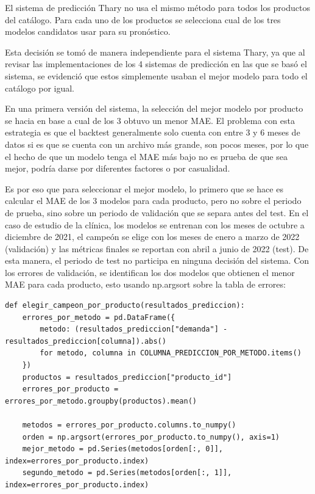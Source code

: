 El sistema de predicción Thary no usa el mismo método para todos los productos del catálogo. Para cada uno de los productos se selecciona cual de los tres modelos candidatos usar para su pronóstico. 

Esta decisión se tomó de manera independiente para el sistema Thary, ya que al revisar las implementaciones de los 4 sistemas de predicción en las que se basó el sistema, se evidenció que estos simplemente usaban el mejor modelo para todo el catálogo por igual.

En una primera versión del sistema, la selección del mejor modelo por producto se hacia en base a cual de los 3 obtuvo un menor MAE. El problema con esta estrategia es que el backtest generalmente solo cuenta con entre 3 y 6 meses de datos si es que se cuenta con un archivo más grande, son pocos meses, por lo que el hecho de que un modelo tenga el MAE más bajo no es prueba de que sea mejor, podría darse por diferentes factores o por casualidad. 

Es por eso que para seleccionar el mejor modelo, lo primero que se hace es calcular el MAE de los 3 modelos para cada producto, pero no sobre el periodo de prueba, sino sobre un periodo de validación que se separa antes del test. En el caso de estudio de la clínica, los modelos se entrenan con los meses de octubre a diciembre de 2021, el campeón se elige con los meses de enero a marzo de 2022 (validación) y las métricas finales se reportan con abril a junio de 2022 (test). De esta manera, el periodo de test no participa en ninguna decisión del sistema. Con los errores de validación, se identifican los dos modelos que obtienen el menor MAE para cada producto, esto usando np.argsort sobre la tabla de errores:

\label{lst:campeon_mejores}
\begin{verbatim}
def elegir_campeon_por_producto(resultados_prediccion):
    errores_por_metodo = pd.DataFrame({
        metodo: (resultados_prediccion["demanda"] - resultados_prediccion[columna]).abs()
        for metodo, columna in COLUMNA_PREDICCION_POR_METODO.items()
    })
    productos = resultados_prediccion["producto_id"]
    errores_por_producto = errores_por_metodo.groupby(productos).mean()

    metodos = errores_por_producto.columns.to_numpy()
    orden = np.argsort(errores_por_producto.to_numpy(), axis=1)
    mejor_metodo = pd.Series(metodos[orden[:, 0]], index=errores_por_producto.index)
    segundo_metodo = pd.Series(metodos[orden[:, 1]], index=errores_por_producto.index)
\end{verbatim}

